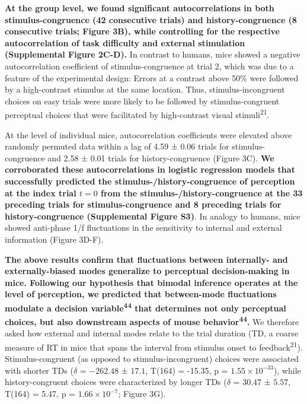 \documentclass[
]{article}
\begin{document}
\textbf{At the group level, we found significant autocorrelations in
both stimulus-congruence (42 consecutive trials) and history-congruence
(8 consecutive trials; Figure 3B), while controlling for the respective
autocorrelation of task difficulty and external stimulation
(Supplemental Figure 2C-D).} In contrast to humans, mice showed a
negative autocorrelation coefficient of stimulus-congruence at trial 2,
which was due to a feature of the experimental design: Errors at a
contrast above 50\% were followed by a high-contrast stimulus at the
same location. Thus, stimulus-incongruent choices on easy trials were
more likely to be followed by stimulus-congruent perceptual choices that
were facilitated by high-contrast visual stimuli\textsuperscript{21}.

At the level of individual mice, autocorrelation coefficients were
elevated above randomly permuted data within a lag of 4.59 ± 0.06 trials
for stimulus-congruence and 2.58 ± 0.01 trials for history-congruence
(Figure 3C). \textbf{We corroborated these autocorrelations in logistic
regression models that successfully predicted the
stimulus-/history-congruence of perception at the index trial \(t = 0\)
from the stimulus-/history-congruence at the 33 preceding trials for
stimulus-congruence and 8 preceding trials for history-congruence
(Supplemental Figure S3)}. In analogy to humans, mice showed anti-phase
1/f fluctuations in the sensitivity to internal and external information
(Figure 3D-F).

\textbf{The above results confirm that fluctuations between internally-
and externally-biased modes generalize to perceptual decision-making in
mice. Following our hypothesis that bimodal inference operates at the
level of perception, we predicted that between-mode fluctuations
modulate a decision variable\textsuperscript{44} that determines not
only perceptual choices, but also downstream aspects of mouse
behavior\textsuperscript{44}.} We therefore asked how external and
internal modes relate to the trial duration (TD, a coarse measure of RT
in mice that spans the interval from stimulus onset to
feedback\textsuperscript{21}). Stimulus-congruent (as opposed to
stimulus-incongruent) choices were associated with shorter TDs
(\(\delta\) = \(-262.48\) ± \(17.1\), T(164) = -15.35, p =
\(\ensuremath{1.55\times 10^{-33}}\)), while history-congruent choices
were characterized by longer TDs (\(\delta\) = \(30.47\) ± \(5.57\),
T(164) = 5.47, p = \(\ensuremath{1.66\times 10^{-7}}\); Figure 3G).
\end{document}
